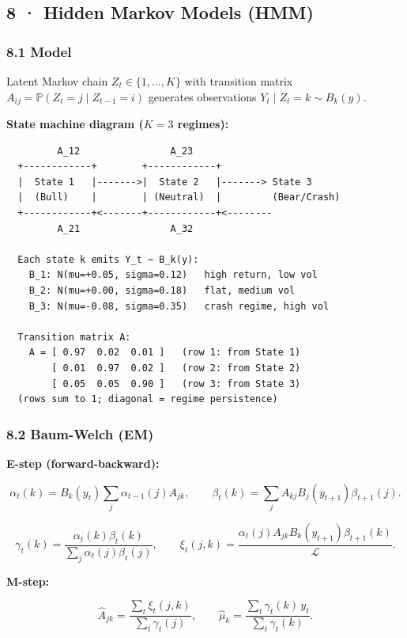 \documentclass[11pt,a4paper]{article}
\begin{document}
\subsection{8 · Hidden Markov Models (HMM)}\label{hidden-markov-models-hmm}

\subsubsection{8.1 Model}\label{model}

Latent Markov chain \(Z_t \in \{1,\ldots,K\}\) with transition matrix \(A_{ij}=\mathbb{P}(Z_t=j\mid Z_{t-1}=i)\) generates observations \(Y_t \mid Z_t=k \sim B_k(y)\).

\textbf{State machine diagram (\(K=3\) regimes):}

\begin{verbatim}
         A_12                A_23
  +------------+        +------------+
  |  State 1   |------->|  State 2   |-------> State 3
  |  (Bull)    |        | (Neutral)  |         (Bear/Crash)
  +------------+<-------+------------+<--------
         A_21                A_32

  Each state k emits Y_t ~ B_k(y):
    B_1: N(mu=+0.05, sigma=0.12)   high return, low vol
    B_2: N(mu=+0.00, sigma=0.18)   flat, medium vol
    B_3: N(mu=-0.08, sigma=0.35)   crash regime, high vol

  Transition matrix A:
    A = [ 0.97  0.02  0.01 ]   (row 1: from State 1)
        [ 0.01  0.97  0.02 ]   (row 2: from State 2)
        [ 0.05  0.05  0.90 ]   (row 3: from State 3)
  (rows sum to 1; diagonal = regime persistence)
\end{verbatim}

\subsubsection{8.2 Baum-Welch (EM)}\label{baum-welch-em}

\textbf{E-step (forward-backward):}

\[\alpha_t(k) = B_k(y_t)\sum_j \alpha_{t-1}(j)A_{jk}, \qquad
\beta_t(k) = \sum_j A_{kj}B_j(y_{t+1})\beta_{t+1}(j).\]

\[\gamma_t(k) = \frac{\alpha_t(k)\beta_t(k)}{\sum_j \alpha_t(j)\beta_t(j)}, \qquad
\xi_t(j,k) = \frac{\alpha_t(j)A_{jk}B_k(y_{t+1})\beta_{t+1}(k)}{\mathcal{L}}.\]

\textbf{M-step:}

\[\hat A_{jk} = \frac{\sum_t \xi_t(j,k)}{\sum_t\gamma_t(j)}, \qquad
\hat\mu_k = \frac{\sum_t \gamma_t(k)\,y_t}{\sum_t \gamma_t(k)}.\]
\end{document}
